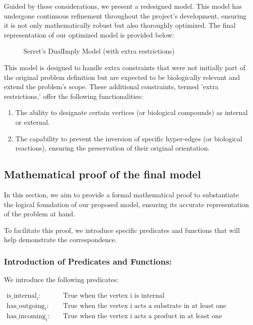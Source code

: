 Guided by these considerations, we present a redesigned model. This model has undergone continuous refinement throughout the project's development, ensuring it is not only mathematically robust but also thoroughly optimized. The final representation of our optimized model is provided below:

\begin{figure}[H]
    \centering
    \caption{Serret's DualImply Model (with extra restrictions)}
    \label{fig:zephyr}
\end{figure}

This model is designed to handle extra constraints that were not initially part of the original problem definition but are expected to be biologically relevant and extend the problem's scope. These additional constraints, termed 'extra restrictions,' offer the following functionalities:

\begin{enumerate}
    \item The ability to designate certain vertices (or biological compounds) as internal or external.

    \item The capability to prevent the inversion of specific hyper-edges (or biological reactions), ensuring the preservation of their original orientation.
\end{enumerate}
    
    
\subsection{Mathematical proof of the final model} \label{sec:math_proof}

In this section, we aim to provide a formal mathematical proof to substantiate the logical foundation of our proposed model, ensuring its accurate representation of the problem at hand.

To facilitate this proof, we introduce specific predicates and functions that will help demonstrate the correspondence.

\subsubsection{Introduction of Predicates and Functions:}

We introduce the following predicates:
    
\begin{align*}
    \text{is\_internal}_{i} : \quad&\text{True when the vertex i is internal}\\
    \text{has\_outgoing}_{i} : \quad&\text{True when the vertex i acts a substrate in at least one hyperedge} \\
    \text{has\_incoming}_{i} : \quad&\text{True when the vertex i acts a product in at least one hyperedge} \\
\end{align*}

